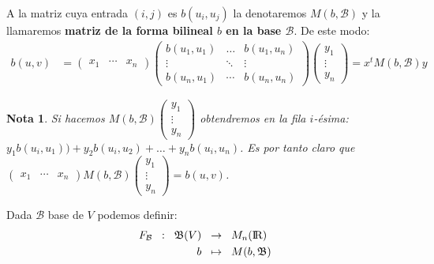 \documentclass[10pt, a4paper]{article}
\theoremstyle{theorem-style}
\theoremstyle{definition-style}
\theoremstyle{remark-style}
\newtheorem*{nota}{Nota}
\theoremstyle{example-style}
\theoremstyle{definition-style}
\theoremstyle{remark-style}
\begin{document}
A la matriz cuya entrada $(i,j)$ es $b(u_i,u_j)$ la denotaremos $M(b, \mathcal{B})$ y la llamaremos \textbf{matriz de la forma bilineal $b$ en la base $\mathcal{B}$}. De este modo:
\begin{align*}
	b(u,v) &= \left(\begin{matrix} x_1 & \cdots & x_n \end{matrix} \right) \left( \begin{matrix} b(u_1, u_1) & \ldots & b(u_1, u_n) \\ \vdots &\ddots & \vdots \\ b(u_n,u_1) & \cdots & b(u_n,u_n) \end{matrix} \right)
	\left( \begin{matrix} y_1 \\ \vdots \\ y_n \end{matrix} \right) = x^tM(b, \mathcal{B})y
\end{align*}

\begin{nota}
	Si hacemos $M(b, \mathcal{B})\left( \begin{matrix} y_1 \\ \vdots \\ y_n \end{matrix} \right)$ obtendremos en la fila $i$-ésima: $y_1b(u_i,u_1))+y_2b(u_i,u_2)+\ldots+y_nb(u_i,u_n)$.
	Es por tanto claro que $\left( \begin{matrix} x_1 & \cdots & x_n \end{matrix} \right)M(b, \mathcal{B})\left( \begin{matrix} y_1 \\ \vdots \\ y_n \end{matrix} \right)=b(u,v)$.
\end{nota}
	
\vspace{2mm}

Dada $\mathcal{B}$ base de $V$ podemos definir:
\begin{align*}
	F_\mathcal{B} \hspace{2mm} : \hspace{2mm} \mathfrak{B}(V) \hspace{2mm} &\rightarrow \hspace{2mm} M_n(\rm I\!R) \\
	b \hspace{2mm} &\mapsto \hspace{2mm} M(b, \mathfrak{B})
\end{align*}
\end{document}
